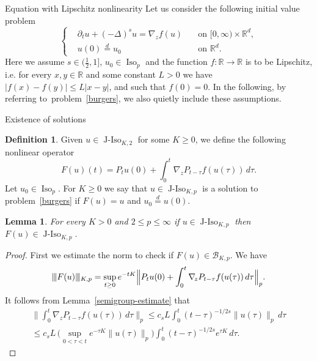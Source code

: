 \documentclass[a4paper,10pt,fleqn]{amsart}
\newtheorem{lemma}[theorem]{Lemma}
\theoremstyle{remark}
\theoremstyle{definition}
\newtheorem{definition}[theorem]{Definition}
\DeclareMathOperator{\Iso}{Iso}
\DeclareMathOperator{\JIso}{J-Iso}
\newcommand{\dt} {\partial_t}
\newcommand{\grad} {\nabla_{\!z}}
\newcommand{\X} {{\mathbb{R}^d}}
\newcommand{\R} {\mathbb{R}}
\newcommand{\T} {[0,\infty)}
\renewcommand{\=} {\overset{d}{=}}
\newcommand{\viii} {|\kern-0.25ex|\kern-0.25ex|}
\newcommand{\K}[2] {\viii #1 \viii_{K,#2}}
\newcommand{\fLap} {(-\Delta)^s}
\begin{document}
    \begin{section}{Equation with Lipschitz nonlinearity}\label{sec-lipschitz}
     Let us consider the following initial value problem
     \begin{equation}\label{burgers}
      \left\{
      \begin{aligned}
        &\dt u + \fLap u = \grad f(u)\quad&\text{on $\T\times\X$}, \\
        &u(0) \= u_0\quad&\text{on $\X$}.
      \end{aligned}
      \right.
    \end{equation}
    Here we assume $s\in(\frac{1}{2},1]$, $u_0\in\Iso_p$ and the function $f:\R\to\R$ is to be Lipschitz, i.e. for every $x,y\in\R$ and some constant $L>0$ we have $|f(x)-f(y)| \leq L |x-y|$,
    and such that $f(0)=0$.
    In the following, by referring to~problem~\eqref{burgers}, we also quietly include these assumptions.
    \begin{subsection}{Existence of solutions}
  \begin{definition}\label{definition}
  Given $u\in\JIso_{K,2}$ for some $K\geq 0$, we define the following nonlinear operator
  \begin{equation*}
    F(u)(t) = P_{t}u(0) + \int_0^{t} \grad P_{t-\tau} f(u(\tau))\,d\tau.
  \end{equation*} 
   Let $u_0\in\Iso_p$. For $K\geq0$ we say that $u\in\JIso_{K,p}$ is a solution to problem~\eqref{burgers} if $F(u)=u$ and $u_0\=u(0)$.
  \end{definition}
  \begin{lemma}\label{Fimage}
   For every $K>0$ and $2\leq p\leq\infty$ if $u\in\JIso_{K,p}$ then $F(u)\in\JIso_{K,p}$.
  \end{lemma}
  \begin{proof}
   First we estimate the norm to check if $F(u)\in \mathcal{B}_{K,p}$.  We have
   \begin{equation*}
       \K{F(u)}{p}
       = \sup_{t\geq0}e^{-tK}\Big\|P_{t}u(0) + \int_0^{t} \grad P_{t-\tau} f(u(\tau))\,d\tau\Big\|_p.
    \end{equation*}
    It follows from Lemma~\ref{semigroup-estimate} that 
    \begin{multline}\label{norm-est1}
            \Big\|\int_0^{t} \grad P_{t-\tau} f(u(\tau))\,d\tau\Big\|_p
            \leq c_sL\int_0^{t} (t-\tau)^{-1/2s}\|u(\tau)\|_p\,d\tau\\
            \leq c_sL\,\Big(\sup_{0<\tau<t}e^{-\tau K}\|u(\tau)\|_p\Big) \int_0^{t} (t-\tau)^{-1/2s} e^{\tau K}\,d\tau.

\end{multline}
\end{proof}
\end{subsection}
\end{section}
\end{document}
